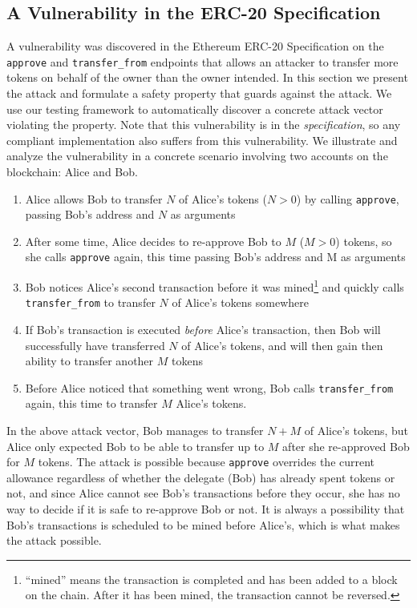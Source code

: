 \documentclass[twoside,11pt,openright]{report}
\newcommand{\coq}[1]{\texttt{#1}}
\begin{document}
\subsection{A Vulnerability in the ERC-20 Specification}
A vulnerability was discovered in the Ethereum ERC-20 Specification on the \coq{approve} and \coq{transfer\_from} endpoints that allows an attacker to transfer more tokens on behalf of the owner than the owner intended\cite{erc20-attack}. In this section we present the attack and formulate a safety property that guards against the attack. We use our testing framework to automatically discover a concrete attack vector violating the property. Note that this vulnerability is in the \textit{specification}, so any compliant implementation also suffers from this vulnerability. We illustrate and analyze the vulnerability in a concrete scenario involving two accounts on the blockchain: Alice and Bob.
\begin{enumerate}
    \item Alice allows Bob to transfer $N$ of Alice's tokens ($N>0$) by calling \coq{approve}, passing Bob's address and $N$ as arguments
    \item After some time, Alice decides to re-approve Bob to $M$ ($M>0$) tokens, so she calls \coq{approve} again, this time passing Bob's address and M as arguments
    \item Bob notices Alice's second transaction before it was mined\footnote{``mined'' means the transaction is completed and has been added to a block on the chain. After it has been mined, the transaction cannot be reversed.} and quickly calls \coq{transfer\_from} to transfer $N$ of Alice's tokens somewhere
    \item If Bob's transaction is executed \textit{before} Alice's transaction,
then Bob will successfully have transferred $N$ of Alice's tokens, and will then gain then ability to transfer another $M$ tokens
    \item Before Alice noticed that something went wrong, Bob calls
\coq{transfer\_from} again, this time to transfer $M$ Alice's tokens.
\end{enumerate}
In the above attack vector, Bob manages to transfer $N+M$ of Alice's tokens, but Alice only expected Bob to be able to transfer up to $M$ after she re-approved Bob for $M$ tokens. The attack is possible because \coq{approve} overrides the current allowance regardless of whether the delegate (Bob) has already spent tokens or not, and since Alice cannot see Bob's transactions before they occur, she has no way to decide if it is safe to re-approve Bob or not. It is always a possibility that Bob's transactions is scheduled to be mined before Alice's, which is what makes the attack possible.
\end{document}
